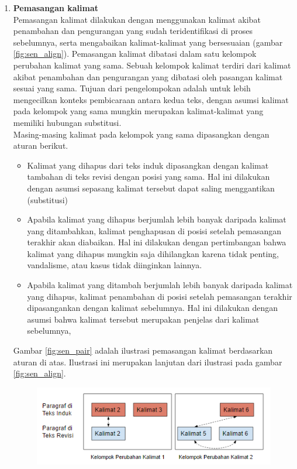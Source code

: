 \begin{enumerate}
	\item \textbf{Pemasangan kalimat}\\
	Pemasangan kalimat dilakukan dengan menggunakan kalimat akibat penambahan dan pengurangan yang sudah teridentifikasi di proses sebelumnya, serta mengabaikan kalimat-kalimat yang bersesuaian (gambar \ref{fig:sen_align}). Pemasangan kalimat dibatasi dalam satu kelompok perubahan kalimat yang sama. Sebuah kelompok kalimat terdiri dari kalimat akibat penambahan dan pengurangan yang dibatasi oleh pasangan kalimat sesuai yang sama. Tujuan dari pengelompokan adalah untuk lebih mengecilkan konteks pembicaraan antara kedua teks, dengan asumsi kalimat pada kelompok yang sama mungkin merupakan kalimat-kalimat yang memiliki hubungan substitusi. \\
	Masing-masing kalimat pada kelompok yang sama dipasangkan dengan aturan berikut.
	\begin{itemize}
		\item Kalimat yang dihapus dari teks induk dipasangkan dengan kalimat tambahan di teks revisi dengan posisi yang sama. Hal ini dilakukan dengan asumsi sepasang kalimat tersebut dapat saling menggantikan (substitusi)
		\item Apabila kalimat yang dihapus berjumlah lebih banyak daripada kalimat yang ditambahkan, kalimat penghapusan di posisi setelah pemasangan terakhir akan diabaikan. Hal ini dilakukan dengan pertimbangan bahwa kalimat yang dihapus mungkin saja dihilangkan karena tidak penting, vandalisme, atau kasus tidak diinginkan lainnya.
		\item Apabila kalimat yang ditambah berjumlah lebih banyak daripada kalimat yang dihapus, kalimat penambahan di posisi setelah pemasangan terakhir dipasangankan dengan kalimat sebelumnya. Hal ini dilakukan dengan asumsi bahwa kalimat tersebut merupakan penjelas dari kalimat sebelumnya,
	\end{itemize}
	Gambar \ref{fig:sen_pair} adalah ilustrasi pemasangan kalimat berdasarkan aturan di atas. Ilustrasi ini merupakan lanjutan dari ilustrasi pada gambar \ref{fig:sen_align}.
	\begin{figure}
		\centering
		\includegraphics[width=0.75\linewidth]{pics/sen_pair}

\end{figure}
\end{enumerate}

